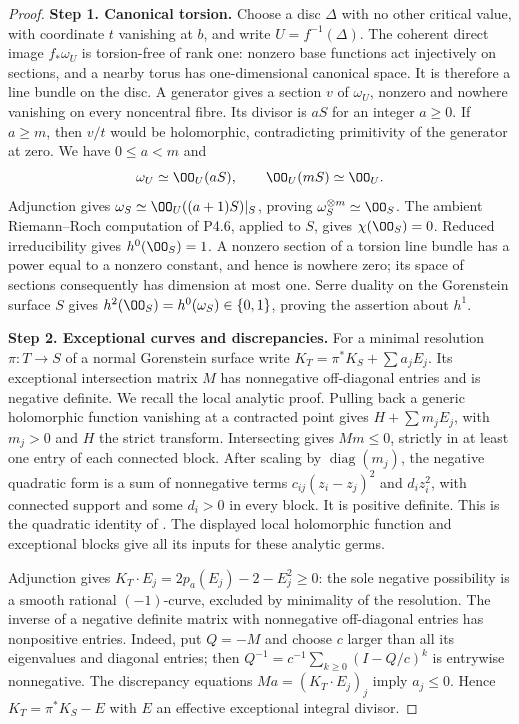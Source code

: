 \begin{proof}
\noindent\textbf{Step 1. Canonical torsion.}
Choose a disc $\Delta$ with no other critical value, with coordinate
$t$ vanishing at $b$, and write $U=f^{-1}(\Delta)$. The coherent
direct image $f_*\omega_U$ is torsion-free of rank one: nonzero
base functions act injectively on sections, and a nearby torus has
one-dimensional canonical space. It is therefore a line bundle
on the disc. A generator gives a section $v$ of $\omega_U$,
nonzero and nowhere vanishing on every noncentral fibre. Its
divisor is $aS$ for an integer $a\ge0$. If $a\ge m$, then $v/t$
would be holomorphic, contradicting primitivity of the generator
at zero. We have $0\le a<m$ and
\[
 \omega_U\simeq\OO_U(aS),\qquad\OO_U(mS)\simeq\OO_U.
\]
Adjunction gives $\omega_S\simeq\OO_U((a+1)S)|_S$, proving
$\omega_S^{\otimes m}\simeq\OO_S$. The ambient
Riemann--Roch computation of P4.6, applied to $S$, gives
$\chi(\OO_S)=0$. Reduced irreducibility gives $h^0(\OO_S)=1$.
A nonzero section of a torsion line bundle has a power equal to
a nonzero constant, and hence is nowhere zero; its space of
sections consequently has dimension at most one. Serre duality
on the Gorenstein surface $S$ gives
$h^2(\OO_S)=h^0(\omega_S)\in\{0,1\}$, proving the assertion
about $h^1$.

\noindent\textbf{Step 2. Exceptional curves and discrepancies.}
For a minimal resolution $\pi:T\to S$ of a normal Gorenstein
surface write $K_T=\pi^*K_S+\sum a_jE_j$. Its exceptional
intersection matrix $M$ has nonnegative off-diagonal entries
and is negative definite. We recall the local analytic proof.
Pulling back a generic holomorphic function vanishing at a
contracted point gives $H+\sum m_jE_j$, with $m_j>0$ and $H$
the strict transform. Intersecting gives $Mm\le0$, strictly in
at least one entry of each connected block. After scaling by
$\operatorname{diag}(m_j)$, the negative quadratic form is a
sum of nonnegative terms $c_{ij}(z_i-z_j)^2$ and $d_i z_i^2$,
with connected support and some $d_i>0$ in every block. It is
positive definite. This is the quadratic identity of
\cite[\S I, unnumbered assertion and proof, p.~6]{Mumford1961}.
The displayed local holomorphic function and exceptional blocks give
all its inputs for these analytic germs.

Adjunction gives
$K_T\cdot E_j=2p_a(E_j)-2-E_j^2\ge0$: the sole negative
possibility is a smooth rational $(-1)$-curve, excluded by
minimality of the resolution. The inverse of a negative definite
matrix with nonnegative off-diagonal entries has nonpositive
entries. Indeed, put $Q=-M$ and choose $c$ larger than all its
eigenvalues and diagonal entries; then
$Q^{-1}=c^{-1}\sum_{k\ge0}(I-Q/c)^k$ is entrywise nonnegative.
The discrepancy equations $Ma=(K_T\cdot E_j)_j$ imply
$a_j\le0$. Hence $K_T=\pi^*K_S-E$ with $E$ an effective
exceptional integral divisor.


\end{proof}
